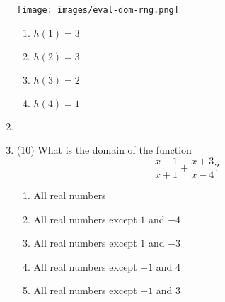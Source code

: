 \documentclass{article}
\begin{document}
\begin{enumerate}
    \texttt{[image: images/eval-dom-rng.png]}
    \begin{enumerate}
        \item $h(1) = 3$
        \item $h(2) = 3$ %
        \item $h(3) = 2$
        \item $h(4) = 1$
    \end{enumerate}
    
    \item 
    
    \item (10) What is the domain of the function
    \[
        \frac{x-1}{x+1} + \frac{x+3}{x-4}?
    \]
    \begin{enumerate}
        \item All real numbers
        \item All real numbers except $1$ and $-4$
        \item All real numbers except $1$ and $-3$
        \item All real numbers except $-1$ and $4$ %
        \item All real numbers except $-1$ and $3$
    \end{enumerate}
    
    
\end{enumerate}
\end{document}
